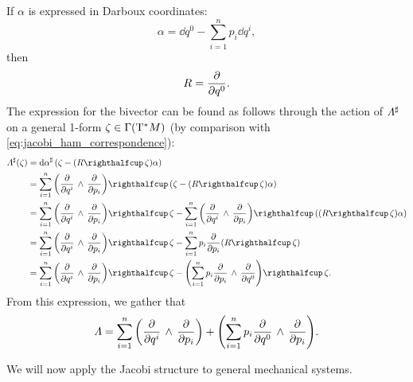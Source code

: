 If \(\alpha\) is expressed in Darboux coordinates:
\begin{equation}
     \alpha = \dd{q}^0 - \sum^n_{i = 1} p_i\dd{q^i},
\end{equation}
then
\begin{equation}
     R = \pdv{}{q^0}.
\end{equation}
The expression for the bivector can be found as follows through the action of \(
\Lambda^\sharp\) on a general 1-form \(\zeta \in \mathrm{\Gamma}\qty(\mathrm{T}^*M)\) (by comparison with \cref{eq:jacobi_ham_correspondence}):
\begin{equation}
    \begin{split}
        \fromDual{\Lambda}(\zeta) &= \fromDual{\dd{\alpha}}\qty(\zeta - (\intpr{R}{\zeta})\alpha) \\
                                 &= \intpr{\sum_{i=1}^n\qty(\wedgep{\pdv{}{q^i}}{\pdv{}{p_i}})}{(\zeta - (\intpr{R}{\zeta})\alpha)} \\
                                 &= \intpr{\sum_{i=1}^n\qty(\wedgep{\pdv{}{q^i}}{\pdv{}{p_i}})}{\zeta} 
                                    - \intpr{\sum_{i=1}^n\qty(\wedgep{\pdv{}{q^i}}{\pdv{}{p_i}})}{((\intpr{R}{\zeta})\alpha)} \\
                                 &= \intpr{\sum_{i=1}^n\qty(\wedgep{\pdv{}{q^i}}{\pdv{}{p_i}})}{\zeta} 
                                    - \sum_{i=1}^n p_i \pdv{}{p_i}(\intpr{R}{\zeta}) (\intpr{R}{\zeta})\\
                                 &= \intpr{\sum_{i=1}^n\qty(\wedgep{\pdv{}{q^i}}{\pdv{}{p_i}})}{\zeta} 
                                    - \intpr{\qty(\sum_{i=1}^n p_i \wedgep{\pdv{}{p_i}}{\pdv{}{q^0}})}{\zeta}. \\
    \end{split}
\end{equation}
From this expression, we gather that 
\begin{equation}
     \Lambda = \sum_{i=1}^n \qty( \pdv{}{q^i}\,\wedge\,\pdv{}{p_i} ) + \qty(\sum_{i=1}^n p_i  \pdv{}{q^0}\,\wedge\,\pdv{}{p_i} ).
\end{equation}

We will now apply the Jacobi structure to general mechanical systems.

